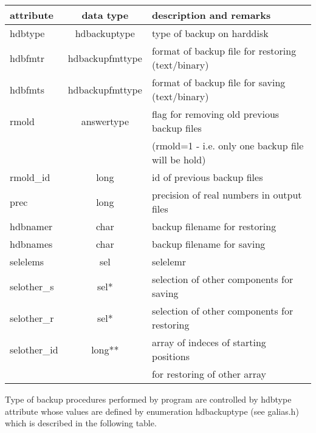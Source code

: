 \begin{center}
\begin{tabular}{|l|c|l|}
\hline
attribute & data type & description and remarks
\\ \hline \hline
{\sf  hdbtype}  & {\sf hdbackuptype} &   type of backup on harddisk
\\ \hline
{\sf hdbfmtr}   & {\sf hdbackupfmttype} &  format of backup file for restoring (text/binary)
\\ \hline
{\sf hdbfmts}   & {\sf hdbackupfmttype} &  format of backup file for saving (text/binary)
\\ \hline
{\sf rmold}    & {\sf answertype} &  flag for removing old previous backup files\\
             &                  & (rmold=1 - i.e. only one backup file will be hold)
\\ \hline
{\sf rmold\_id}      & {\sf long} &  id of previous backup files 
\\ \hline
{\sf prec}     & {\sf long} &  precision of real numbers in output files
\\ \hline
{\sf hdbnamer}  & {\sf char} &  backup filename for restoring
\\ \hline
{\sf hdbnames}  & {\sf char} &  backup filename for saving
\\ \hline
{\sf selelems}  & {\sf sel} &  selelemr
\\ \hline
{\sf selother\_s} & {\sf sel*} &  selection of other components for saving
\\ \hline
{\sf selother\_r} & {\sf sel*} &  selection of other components for restoring
\\ \hline
{\sf selother\_id} & {\sf long**} &  array of indeces of starting positions\\
              &              &  for restoring of other array
\\ \hline
\end{tabular}
\end{center}

Type of backup procedures performed by program are controlled by {\sf hdbtype} attribute
whose values are defined by enumeration {\sf hdbackuptype} (see {\sf galias.h}) which is described
in the following table.

